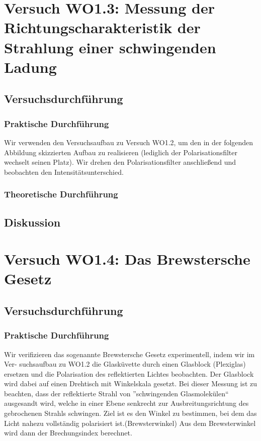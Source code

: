 \documentclass[12pt]{scrartcl}
\begin{document}
\section{Versuch WO1.3:
Messung der Richtungscharakteristik der Strahlung einer schwingenden Ladung}
\subsection{Versuchsdurchführung}
\subsubsection{Praktische Durchführung}
Wir verwenden den Versuchsaufbau zu Versuch WO1.2, um den in der folgenden Abbildung skizzierten Aufbau zu realisieren (lediglich der Polarisationsfilter wechselt seinen Platz).
Wir drehen den Polarisationsfilter anschließend und beobachten den Intensitätsunterschied.
\subsubsection{Theoretische Durchführung}
\subsection{Diskussion}

\section{Versuch WO1.4:
Das Brewstersche Gesetz}
\subsection{Versuchsdurchführung}
\subsubsection{Praktische Durchführung}
Wir verifizieren das sogenannte Brewstersche Gesetz experimentell, indem wir im Ver-
suchsaufbau zu WO1.2 die Glasküvette durch einen Glasblock (Plexiglas) ersetzen und
die Polarisation des reflektierten Lichtes beobachten.
Der Glasblock wird dabei auf einen Drehtisch mit Winkelskala gesetzt.
Bei dieser Messung ist zu beachten, dass der reflektierte Strahl von ”schwingenden Glasmolekülen“ ausgesandt wird, welche in einer Ebene
senkrecht zur Ausbreitungsrichtung des gebrochenen Strahls schwingen.
Ziel ist es den Winkel zu bestimmen, bei dem das Licht nahezu vollständig polarisiert ist.(Brewsterwinkel)
Aus dem Brewsterwinkel wird dann %
der Brechungsindex berechnet.
\end{document}

